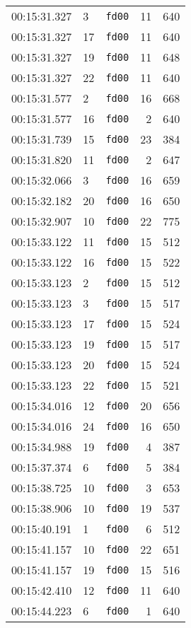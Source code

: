 \documentclass{article}
\begin{document}
\begin{longtable}{lllrr}
00:15:31.327 & 3 & \texttt{fd00} & 11 & 640 \\
00:15:31.327 & 17 & \texttt{fd00} & 11 & 640 \\
00:15:31.327 & 19 & \texttt{fd00} & 11 & 648 \\
00:15:31.327 & 22 & \texttt{fd00} & 11 & 640 \\
00:15:31.577 & 2 & \texttt{fd00} & 16 & 668 \\
00:15:31.577 & 16 & \texttt{fd00} & 2 & 640 \\
00:15:31.739 & 15 & \texttt{fd00} & 23 & 384 \\
00:15:31.820 & 11 & \texttt{fd00} & 2 & 647 \\
00:15:32.066 & 3 & \texttt{fd00} & 16 & 659 \\
00:15:32.182 & 20 & \texttt{fd00} & 16 & 650 \\
00:15:32.907 & 10 & \texttt{fd00} & 22 & 775 \\
00:15:33.122 & 11 & \texttt{fd00} & 15 & 512 \\
00:15:33.122 & 16 & \texttt{fd00} & 15 & 522 \\
00:15:33.123 & 2 & \texttt{fd00} & 15 & 512 \\
00:15:33.123 & 3 & \texttt{fd00} & 15 & 517 \\
00:15:33.123 & 17 & \texttt{fd00} & 15 & 524 \\
00:15:33.123 & 19 & \texttt{fd00} & 15 & 517 \\
00:15:33.123 & 20 & \texttt{fd00} & 15 & 524 \\
00:15:33.123 & 22 & \texttt{fd00} & 15 & 521 \\
00:15:34.016 & 12 & \texttt{fd00} & 20 & 656 \\
00:15:34.016 & 24 & \texttt{fd00} & 16 & 650 \\
00:15:34.988 & 19 & \texttt{fd00} & 4 & 387 \\
00:15:37.374 & 6 & \texttt{fd00} & 5 & 384 \\
00:15:38.725 & 10 & \texttt{fd00} & 3 & 653 \\
00:15:38.906 & 10 & \texttt{fd00} & 19 & 537 \\
00:15:40.191 & 1 & \texttt{fd00} & 6 & 512 \\
00:15:41.157 & 10 & \texttt{fd00} & 22 & 651 \\
00:15:41.157 & 19 & \texttt{fd00} & 15 & 516 \\
00:15:42.410 & 12 & \texttt{fd00} & 11 & 640 \\
00:15:44.223 & 6 & \texttt{fd00} & 1 & 640 \\

\end{longtable}
\end{document}
